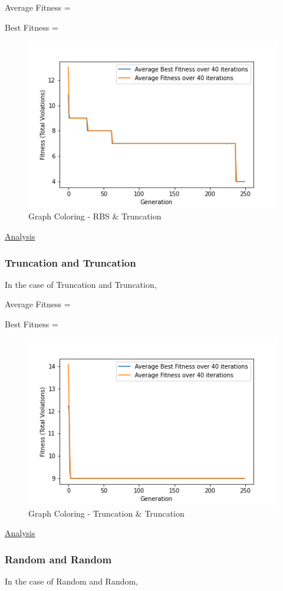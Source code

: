 \documentclass[11pt, letterpaper]{article}
\begin{document}
Average Fitness = 

Best Fitness = 
\begin{figure}[h]
    \centering
    \includegraphics[scale = 0.6]{images/graphcoloring_rb_tr.png}
    \caption {Graph Coloring - RBS \& Truncation}
    \label {fig:gcBT}
\end{figure}

\underline{Analysis}

\subsubsection {Truncation and Truncation}
In the case of Truncation and Truncation,

Average Fitness = 

Best Fitness = 
\begin{figure}[H]
    \centering
    \includegraphics[scale = 0.6]{images/graphcoloring_tr_tr.png}
    \caption {Graph Coloring - Truncation \& Truncation}
    \label {fig:gcTT}
\end{figure}

\underline{Analysis}
\subsubsection {Random and Random}
In the case of Random and Random,
\end{document}
